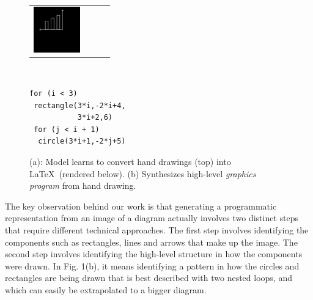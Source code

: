 \documentclass{article}
\newcommand{\exampleImageSize}{2cm}
\theoremstyle{definition}
\begin{document}
\begin{figure}[H]
\begin{minipage}[t]{0.7\linewidth}
\begin{tabular}{llll}
    \includegraphics[width = \exampleImageSize]{figures/58.png}
\end{tabular}
\subcaption{}
  \end{minipage}%
  \begin{minipage}[t]{0.3\linewidth}
    \\
    \begin{minipage}[t]{0.3\linewidth}
\begin{Verbatim}
for (i < 3)
 rectangle(3*i,-2*i+4,
           3*i+2,6)
 for (j < i + 1)
  circle(3*i+1,-2*j+5)
\end{Verbatim}      
      \end{minipage}
    \subcaption{}
  \end{minipage}
  \caption{(a): Model learns to convert hand drawings (top) into \LaTeX~(rendered below). (b) Synthesizes high-level \emph{graphics program} from hand drawing.}\label{firstPageExamples}
\end{figure}
 
The key observation behind our work is that generating a programmatic representation from an image of a diagram actually involves two distinct steps that require different technical approaches. The first step involves identifying the components such as rectangles, lines and arrows that make up the image. The second step involves identifying the high-level structure in how the components were drawn. In Fig. 1(b), it means identifying a pattern in how the circles and rectangles are being drawn that is best described with two nested loops, and which can easily be extrapolated to a bigger diagram. 
\end{document}
